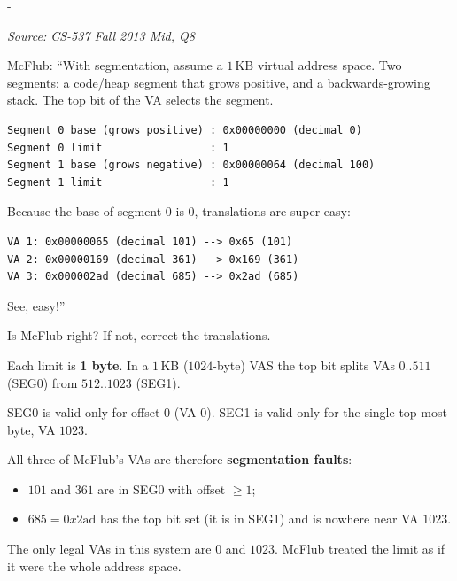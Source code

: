 \documentclass[11pt,a4paper]{article}
\makeatletter
\newcommand{\keepspace}[1]{\par\penalty-100\begingroup
  \setlength{\dimen@}{#1}\dimen@ii\pagegoal\advance\dimen@ii-\pagetotal
  \ifdim\dimen@>\dimen@ii\ifdim\dimen@ii>\z@\vfil\fi\break\fi\endgroup}
\newcounter{qn}[section]
\newenvironment{Qn}[4]{%
  \refstepcounter{qn}\keepspace{7\baselineskip}%
  \begin{tcolorbox}[qboxstyle, title={Q\thesection.\theqn\ \ [#1 \textbar\ #2]\ \ #4}]%
  {\footnotesize\color{g3}\textit{Source: #3}}\par\smallskip%
}{%
  \end{tcolorbox}%
}
\newenvironment{Sol}{%
  \begin{tcolorbox}[sboxstyle, title={Solution}]%
}{%
  \end{tcolorbox}\vspace{0.35em}%
}
\makeatother
\begin{document}
\begin{Qn}{Hard}{Lect 10}{CS-537 Fall 2013 Mid, Q8}{McFlub's ``easy'' backward-stack translations are all faults}
McFlub: ``With segmentation, assume a $1$\,KB virtual address space.
Two segments: a code/heap segment that grows positive, and a
backwards-growing stack. The top bit of the VA selects the segment.

\begin{lstlisting}[numbers=none]
Segment 0 base (grows positive) : 0x00000000 (decimal 0)
Segment 0 limit                 : 1
Segment 1 base (grows negative) : 0x00000064 (decimal 100)
Segment 1 limit                 : 1
\end{lstlisting}

Because the base of segment 0 is $0$, translations are super easy:
\begin{lstlisting}[numbers=none]
VA 1: 0x00000065 (decimal 101) --> 0x65 (101)
VA 2: 0x00000169 (decimal 361) --> 0x169 (361)
VA 3: 0x000002ad (decimal 685) --> 0x2ad (685)
\end{lstlisting}
See, easy!''

Is McFlub right? If not, correct the translations.
\end{Qn}
\begin{Sol}
Each limit is \textbf{1 byte}. In a $1$\,KB ($1024$-byte) VAS the top
bit splits VAs $0..511$ (SEG0) from $512..1023$ (SEG1).

SEG0 is valid only for offset $0$ (VA $0$).
SEG1 is valid only for the single top-most byte, VA $1023$.

All three of McFlub's VAs are therefore \textbf{segmentation faults}:
\begin{itemize}
  \item $101$ and $361$ are in SEG0 with offset $\ge 1$;
  \item $685=0x2\mathrm{ad}$ has the top bit set (it is in SEG1) and
        is nowhere near VA $1023$.
\end{itemize}
The only legal VAs in this system are $0$ and $1023$. McFlub treated
the limit as if it were the whole address space.
\end{Sol}
\end{document}
